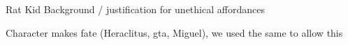 

Rat Kid Background / justification for unethical affordances

Character makes fate (Heraclitus, gta, Miguel), we used the same to allow this 